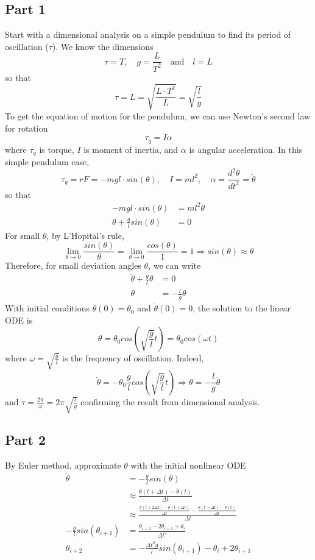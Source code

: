 \documentclass{article}
\begin{document}
\subsection{Part 1}
Start with a dimensional analysis on a simple pendulum to find its period of oscillation ($\tau$). We know the dimensions
\[\tau=T,\quad g=\frac{L}{T^2}\quad \textrm{and}\quad l=L\]
so that \[\tau=L=\sqrt{\frac{L\cdot T^2}{L}}=\sqrt{\frac{l}{g}}\]
To get the equation of motion for the pendulum, we can use Newton's second law for rotation
\[\tau_q=I\alpha\]
where $\tau_q$ is torque, $I$ is moment of inertia, and $\alpha$ is angular acceleration. In this simple pendulum case,
\[\tau_q=rF=-mgl \cdot sin(\theta),\quad I=ml^2,\quad \alpha=\frac{d^2\theta}{dt^2}=\ddot{\theta}\]
so that
\begin{align*}
    -mgl \cdot sin(\theta) &= ml^2\ddot{\theta}\\
    \ddot{\theta}+\frac{g}{l}sin(\theta) &= 0
\end{align*}
For small $\theta$, by L'Hopital's rule,
\[\lim_{\theta\to 0}\frac{sin(\theta)}{\theta}=\lim_{\theta\to 0}\frac{cos(\theta)}{1}=1 \Rightarrow sin(\theta)\approx\theta\]
Therefore, for small deviation angles $\theta$, we can write
\begin{align*}
    \ddot{\theta}+\frac{g}{l}\theta &= 0\\
    \theta &= -\frac{l}{g}\ddot{\theta} \tag{1}
\end{align*}
With initial conditions $\theta(0)=\theta_0$ and $\dot{\theta}(0)=0$, the solution to the linear ODE is \[\theta=\theta_0 cos(\sqrt{\frac{g}{l}}t) = \theta_0 cos(\omega t)\] where $\omega=\sqrt{\frac{g}{l}}$ is the frequency of oscillation.
Indeed, \[\ddot{\theta}=-\theta_0\frac{g}{l}cos(\sqrt{\frac{g}{l}}t) \Rightarrow \theta = -\frac{l}{g}\ddot{\theta}\]
and $\tau=\frac{2\pi}{\omega}=2\pi\sqrt{\frac{l}{g}}$ confirming the result from dimensional analysis.

\subsection{Part 2}
By Euler method, approximate $\theta$ with the initial nonlinear ODE
\begin{align*}
    \ddot{\theta} &= -\frac{g}{l}sin(\theta)\\
    &\approx \frac{\dot{\theta}(t+\Delta t)-\dot{\theta}(t)}{\Delta t}\\
    &\approx \frac{\frac{\theta(t+2\Delta t)-\theta(t+\Delta t)}{\Delta t}-\frac{\theta(t+\Delta t)-\theta(t)}{\Delta t}}{\Delta t}\\
    -\frac{g}{l}sin(\theta_{i+1}) &= \frac{\theta_{i+2}-2\theta_{i+1}+\theta_i}{\Delta t^2}\\
    \theta_{i+2} &= -\frac{\Delta t^2 g}{l}sin(\theta_{i+1})-\theta_i+2\theta_{i+1} \tag{2}
\end{align*}
\end{document}
